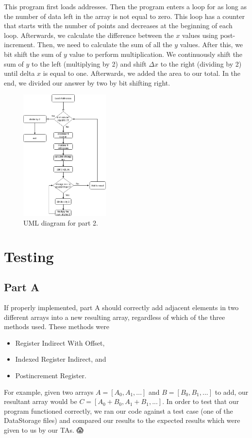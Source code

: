 \documentclass[10pt, letterpaper, titlepage]{article} %
\begin{document}
\begin{multicols*}{2}
This program first loads addresses. Then the program enters a loop for as long as the number of data left in the array is not equal to zero. This loop has a counter that starts with the number of points and decreases at the beginning of each loop. Afterwards, we calculate the difference between the $x$ values using post-increment. Then, we need to calculate the sum of all the $y$ values. After this, we bit shift the sum of $y$ value to perform multiplication. We continuously shift the sum of $y$ to the  left (multiplying by 2) and shift $\Delta x$ to the right (dividing by 2) until delta $x$ is equal to one. Afterwards, we added the area to our total. In the end, we divided our answer by two by bit shifting right. 🍄🍄

\begin{figure}[H]
   \includegraphics[width=0.4\textwidth]{part2.png}
   \centering  
   \caption{UML diagram for part 2.} 
   \label{figure:5}
\end{figure}

\section{Testing}
\subsection{Part A}
If properly implemented, part A should correctly add adjacent elements in two different arrays into a new resulting array, regardless of which of the three methods used. 
These methods were
\begin{itemize}
	\item Register Indirect With Offset,
	\item Indexed Register Indirect, and
	\item Postincrement Register.
\end{itemize}
For example, given two arrays $A = [A_0, A_1, ...]$ and $B = [B_0, B_1, ...]$ to add, our resultant array would be $C = [A_0 + B_0, A_1 + B_1, ...]$.
In order to test that our program functioned correctly, we ran our code against a test case (one of the DataStorage files) and compared our results to the expected results which were given to us by our TAs. 😱


\end{multicols*}
\end{document}
